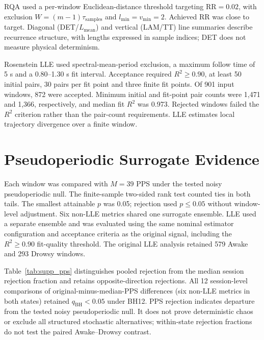 \documentclass[conference,a4paper]{IEEEtran}
\begin{document}
RQA used a per-window Euclidean-distance threshold targeting $\mathrm{RR}=0.02$, with exclusion $W=(m-1)\tau_{\mathrm{samples}}$ and $l_{\min}=v_{\min}=2$. Achieved RR was close to target. Diagonal (DET/$L_{\mathrm{mean}}$) and vertical (LAM/TT) line summaries describe recurrence structure, with lengths expressed in sample indices; DET does not measure physical determinism.

Rosenstein LLE used spectral-mean-period exclusion, a maximum follow time of 5 s and a 0.80--1.30 s fit interval. Acceptance required $R^2\geq0.90$, at least 50 initial pairs, 30 pairs per fit point and three finite fit points. Of 901 input windows, 872 were accepted. Minimum initial and fit-point pair counts were 1,471 and 1,366, respectively, and median fit $R^2$ was 0.973. Rejected windows failed the $R^2$ criterion rather than the pair-count requirements. LLE estimates local trajectory divergence over a finite window.


\section{Pseudoperiodic Surrogate Evidence}
\label{sec:supp_5}

Each window was compared with $M=39$ PPS under the tested noisy pseudoperiodic null. The finite-sample two-sided rank test counted ties in both tails. The smallest attainable $p$ was 0.05; rejection used $p\leq0.05$ without window-level adjustment. Six non-LLE metrics shared one surrogate ensemble. LLE used a separate ensemble and was evaluated using the same nominal estimator configuration and acceptance criteria as the original signal, including the $R^2\geq0.90$ fit-quality threshold. The original LLE analysis retained 579 Awake and 293 Drowsy windows.

Table~\ref{tab:supp_pps} distinguishes pooled rejection from the median session rejection fraction and retains opposite-direction rejections. All 12 session-level comparisons of original-minus-median-PPS differences (six non-LLE metrics in both states) retained $q_{\mathrm{BH}}<0.05$ under BH12. PPS rejection indicates departure from the tested noisy pseudoperiodic null. It does not prove deterministic chaos or exclude all structured stochastic alternatives; within-state rejection fractions do not test the paired Awake--Drowsy contrast.
\end{document}
